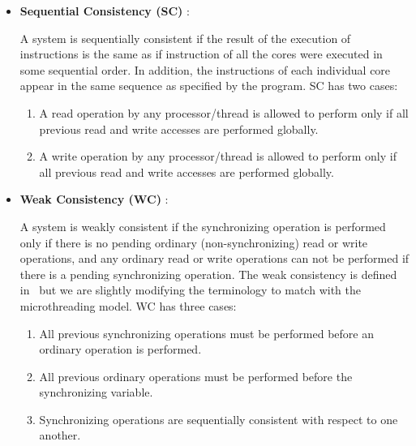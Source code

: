 \documentclass{article}
\begin{document}
\begin{itemize}

\item \textbf{Sequential Consistency (SC)} :

\noindent A system is sequentially consistent if the result of the execution of
instructions is the same as if instruction of all the cores were executed in
some sequential order. In addition, the instructions of each individual core
appear in the same sequence as specified by the program. SC has two cases:

\begin{enumerate}

\item A read operation by any processor/thread is allowed to perform only if
    all previous read and write accesses are performed globally.

\item A write operation by any processor/thread is allowed to perform only if
    all previous read and write accesses are performed globally.

\end{enumerate}

\item \textbf{Weak Consistency (WC)} :

\noindent A system is weakly consistent if the synchronizing operation is
performed only if there is no pending ordinary (non-synchronizing) read or
write operations, and any ordinary read or write operations can not be
performed if there is a pending synchronizing operation. The weak consistency
is defined in~\cite{Gharachorloo:1990:MCE:325096.325102} but we are slightly
modifying the terminology to match with the microthreading model. WC has three
cases:

\begin{enumerate}

\item All previous synchronizing operations must be performed before an
    ordinary operation is performed.

\item All previous ordinary operations must be performed before the
    synchronizing variable.

\item Synchronizing operations are sequentially consistent with respect to one
    another.

\end{enumerate}

\end{itemize}
\end{document}
